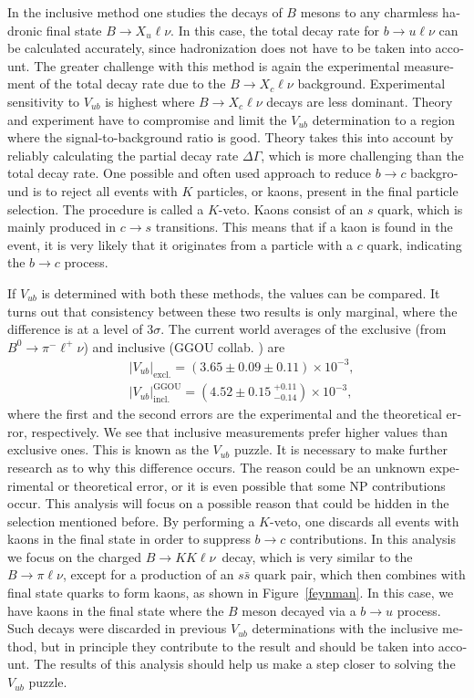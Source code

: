 \documentclass[headings=standardclasses,headings=big,oneside,a4paper,openany,12pt]{scrbook}
\newcommand {\E}[1]{\times 10^{#1}}
\newcommand {\decaya}{$B \to K K \ell \nu$}
\begin{document}
\begin{otherlanguage}{slovene}
In the inclusive method one studies the decays of $B$ mesons to any charmless hadronic final state $B \to X_u \ell \nu$. In this case, the total decay rate for $b \to u \ell \nu$ can be calculated accurately, since hadronization does not have to be taken into account. The greater challenge with this method is again the experimental measurement of the total decay rate due to the $B \to X_c \ell \nu$ background. Experimental sensitivity to $V_{ub}$ is highest where $B \to X_c \ell \nu$ decays are less dominant. Theory and experiment have to compromise and limit the $V_{ub}$ determination to a region where the signal-to-background ratio is good. Theory takes this into account by reliably calculating the partial decay rate $\Delta \Gamma$, which is more challenging than the total decay rate. One possible and often used approach to reduce $b \to c$ background is to reject all events with $K$ particles, or kaons, present in the final particle selection. The procedure is called a $K$-veto. Kaons consist of an $s$ quark, which is mainly produced in $c \to s$ transitions. This means that if a kaon is found in the event, it is very likely that it originates from a particle with a $c$ quark, indicating the $b \to c$ process. 

If $V_{ub}$ is determined with both these methods, the values can be compared. It turns out that consistency between these two results is only marginal, where the difference is at a level of $3\sigma$. The current world averages \cite{Amhis:2016xyh} of the exclusive (from $B^0 \to \pi^- \ell^+ \nu$) and inclusive (GGOU collab. \cite{Gambino:2007rp}) are
\begin{align}
&\vert V_{ub} \vert_{\mathrm{excl.}} = \left(3.65 \pm 0.09 \pm 0.11\right)\E{-3},\\
&\vert V_{ub} \vert_{\mathrm{incl.}}^{\mathrm{GGOU}} = \left(4.52 \pm 0.15~{}^{+0.11}_{-0.14}\right)\E{-3},
\end{align}
where the first and the second errors are the experimental and the theoretical error, respectively. We see that inclusive measurements prefer higher values than exclusive ones. This is known as the $V_{ub}$ puzzle. It is necessary to make further research as to why this difference occurs. The reason could be an unknown experimental or theoretical error, or it is even possible that some NP contributions occur. This analysis will focus on a possible reason that could be hidden in the selection mentioned before. By performing a $K$-veto, one discards all events with kaons in the final state in order to suppress $b \to c$ contributions. In this analysis we focus on the charged \decaya~decay, which is very similar to the $B \to \pi \ell \nu$, except for a production of an $s \bar s$ quark pair, which then combines with final state quarks to form kaons, as shown in Figure~\ref{feynman}. In this case, we have kaons in the final state where the $B$ meson decayed via a $b \to u$ process. Such decays were discarded in previous $V_{ub}$ determinations with the inclusive method, but in principle they contribute to the result and should be taken into account. The results of this analysis should help us make a step closer to solving the $V_{ub}$ puzzle. 


\end{otherlanguage}
\end{document}
